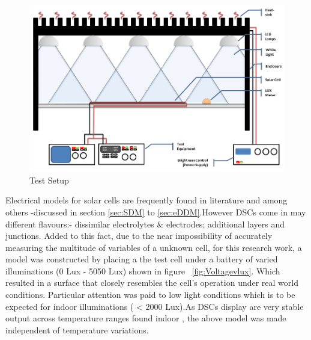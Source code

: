  \begin{figure}[H]
	  \begin{center}
		  \includegraphics[width=\textwidth]{images/Light_Box}
		  \caption{Test Setup }
		  \label{fig:test setup}
	  \end{center}
  \end{figure}
  

Electrical models for solar cells are frequently found in literature \cite{vignati2012solutions} and \cite{yong2008modeling} among others -discussed in section \ref{sec:SDM} to \ref{sec:eDDM}.However \ac{DSCs} come in may different flavours:- dissimilar electrolytes \& electrodes; additional layers and junctions. Added to this fact, due to the near impossibility of accurately measuring the multitude of variables of a unknown cell, for this research work, a model was constructed by placing a the test cell under a battery of varied illuminations (0 Lux - 5050 Lux) shown in figure ~\ref{fig:Voltagevlux}. Which resulted in a surface that closely resembles the cell's operation under real world conditions. Particular attention was paid to low light conditions which is to be expected for indoor illuminations ( < 2000 Lux).As \ac{DSCs} display are very stable output across temperature ranges found indoor \cite{lee2010high}, the above model was made independent of temperature variations.

